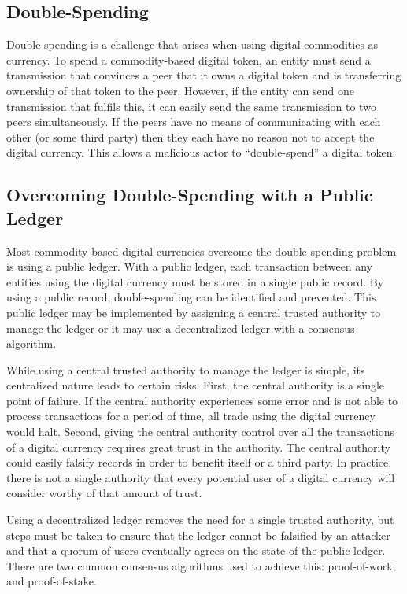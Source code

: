 \documentclass[runningheads]{llncs}
\begin{document}
\subsection{Double-Spending}
Double spending is a challenge that arises when using digital commodities as currency. To spend a commodity-based digital token, an entity must send a transmission that convinces a peer that it owns a digital token and is transferring ownership of that token to the peer. However, if the entity can send one transmission that fulfils this, it can easily send the same transmission to two peers simultaneously. If the peers have no means of communicating with each other (or some third party) then they each have no reason not to accept the digital currency. This allows a malicious actor to “double-spend” a digital token.

\subsection{Overcoming Double-Spending with a Public Ledger}
Most commodity-based digital currencies overcome the double-spending problem is using a public ledger. With a public ledger, each transaction between any entities using the digital currency must be stored in a single public record. By using a public record, double-spending can be identified and prevented. This public ledger may be implemented by assigning a central trusted authority to manage the ledger or it may use a decentralized ledger with a consensus algorithm. 

While using a central trusted authority to manage the ledger is simple, its centralized nature leads to certain risks. First, the central authority is a single point of failure. If the central authority experiences some error and is not able to process transactions for a period of time, all trade using the digital currency would halt. Second, giving the central authority control over all the transactions of a digital currency requires great trust in the authority. The central authority could easily falsify records in order to benefit itself or a third party. In practice, there is not a single authority that every potential user of a digital currency will consider worthy of that amount of trust.

Using a decentralized ledger removes the need for a single trusted authority, but steps must be taken to ensure that the ledger cannot be falsified by an attacker and that a quorum of users eventually agrees on the state of the public ledger. There are two common consensus algorithms used to achieve this: proof-of-work, and proof-of-stake.
\end{document}
